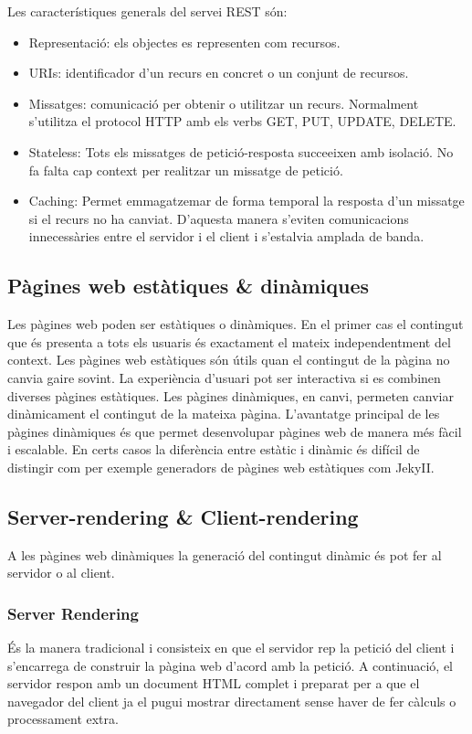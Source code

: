 \documentclass[12pt, titlepage]{article}
\begin{document}
Les característiques generals del servei REST són:
\begin{itemize}
\item Representació: els objectes es representen com recursos.
\item URIs: identificador d’un recurs en concret o un conjunt de recursos.
\item Missatges: comunicació per obtenir o utilitzar un recurs. Normalment s’utilitza el protocol HTTP amb els verbs GET, PUT, UPDATE, DELETE.
\item Stateless: Tots els missatges de petició-resposta succeeixen amb isolació. No fa falta cap context per realitzar un missatge de petició.
\item Caching: Permet emmagatzemar de forma temporal la resposta d’un missatge si el recurs no ha canviat. D’aquesta manera s’eviten comunicacions innecessàries entre el servidor i el client i s’estalvia amplada de banda.
\end{itemize}

\subsection{Pàgines web estàtiques \& dinàmiques}
Les pàgines web poden ser estàtiques o dinàmiques. En el primer cas el contingut
que és presenta a tots els usuaris és exactament el mateix independentment del
context. Les pàgines web estàtiques són útils quan el contingut de la pàgina no
canvia gaire sovint. La experiència d’usuari pot ser interactiva si es combinen
diverses pàgines estàtiques. Les pàgines dinàmiques, en canvi, permeten canviar
dinàmicament el contingut de la mateixa pàgina. L’avantatge principal de les
pàgines dinàmiques és que permet desenvolupar pàgines web de manera més fàcil i
escalable. En certs casos la diferència entre estàtic i dinàmic és difícil de
distingir com per exemple generadors de pàgines web estàtiques com JekyII.

\subsection{Server-rendering \& Client-rendering}

A les pàgines web dinàmiques la generació del contingut dinàmic és pot fer al servidor o al client.

\subsubsection{Server Rendering}
És la manera tradicional i consisteix en que el servidor rep la petició del
client i s’encarrega de construir la pàgina web d’acord amb la petició. A continuació,
el servidor respon amb un document HTML complet i preparat per a que el navegador
del client ja el pugui mostrar directament sense haver de fer càlculs o processament extra.
\end{document}
